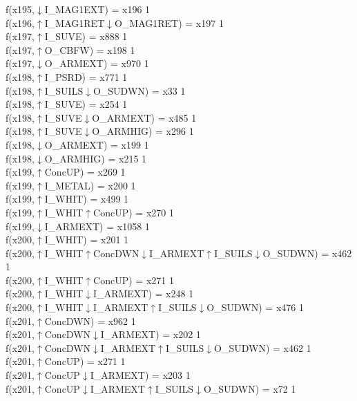 f(x195,$\downarrow$I\_MAG1EXT) = x196 {1} \\
f(x196,$\uparrow$I\_MAG1RET$\downarrow$O\_MAG1RET) = x197 {1} \\
f(x197,$\uparrow$I\_SUVE) = x888 {1} \\
f(x197,$\uparrow$O\_CBFW) = x198 {1} \\
f(x197,$\downarrow$O\_ARMEXT) = x970 {1} \\
f(x198,$\uparrow$I\_PSRD) = x771 {1} \\
f(x198,$\uparrow$I\_SUILS$\downarrow$O\_SUDWN) = x33 {1} \\
f(x198,$\uparrow$I\_SUVE) = x254 {1} \\
f(x198,$\uparrow$I\_SUVE$\downarrow$O\_ARMEXT) = x485 {1} \\
f(x198,$\uparrow$I\_SUVE$\downarrow$O\_ARMHIG) = x296 {1} \\
f(x198,$\downarrow$O\_ARMEXT) = x199 {1} \\
f(x198,$\downarrow$O\_ARMHIG) = x215 {1} \\
f(x199,$\uparrow$ConcUP) = x269 {1} \\
f(x199,$\uparrow$I\_METAL) = x200 {1} \\
f(x199,$\uparrow$I\_WHIT) = x499 {1} \\
f(x199,$\uparrow$I\_WHIT$\uparrow$ConcUP) = x270 {1} \\
f(x199,$\downarrow$I\_ARMEXT) = x1058 {1} \\
f(x200,$\uparrow$I\_WHIT) = x201 {1} \\
f(x200,$\uparrow$I\_WHIT$\uparrow$ConcDWN$\downarrow$I\_ARMEXT$\uparrow$I\_SUILS$\downarrow$O\_SUDWN) = x462 {1} \\
f(x200,$\uparrow$I\_WHIT$\uparrow$ConcUP) = x271 {1} \\
f(x200,$\uparrow$I\_WHIT$\downarrow$I\_ARMEXT) = x248 {1} \\
f(x200,$\uparrow$I\_WHIT$\downarrow$I\_ARMEXT$\uparrow$I\_SUILS$\downarrow$O\_SUDWN) = x476 {1} \\
f(x201,$\uparrow$ConcDWN) = x962 {1} \\
f(x201,$\uparrow$ConcDWN$\downarrow$I\_ARMEXT) = x202 {1} \\
f(x201,$\uparrow$ConcDWN$\downarrow$I\_ARMEXT$\uparrow$I\_SUILS$\downarrow$O\_SUDWN) = x462 {1} \\
f(x201,$\uparrow$ConcUP) = x271 {1} \\
f(x201,$\uparrow$ConcUP$\downarrow$I\_ARMEXT) = x203 {1} \\
f(x201,$\uparrow$ConcUP$\downarrow$I\_ARMEXT$\uparrow$I\_SUILS$\downarrow$O\_SUDWN) = x72 {1} \\
